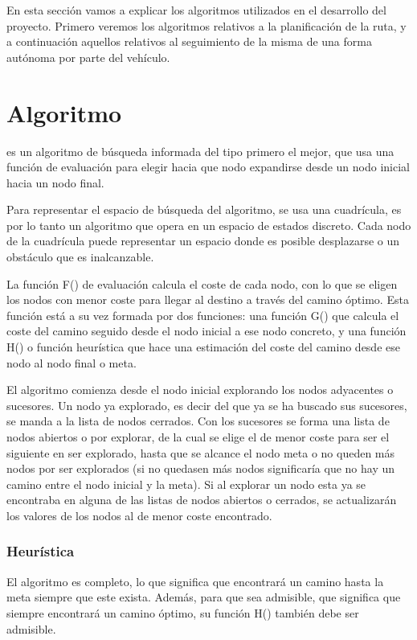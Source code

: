 
En esta sección vamos a explicar los algoritmos utilizados en el desarrollo del proyecto. Primero veremos los algoritmos relativos a la planificación de la ruta, y a continuación aquellos relativos al seguimiento de la misma de una forma autónoma por parte del vehículo.

\section{Algoritmo \Astar}

\Astar es un algoritmo de búsqueda informada del tipo primero el mejor, que usa una función de evaluación para elegir hacia que nodo expandirse desde un nodo inicial hacia un nodo final.

Para representar el espacio de búsqueda del algoritmo, se usa una cuadrícula, es por lo tanto un algoritmo que opera en un espacio de estados discreto. Cada nodo de la cuadrícula puede representar un espacio donde es posible desplazarse o un obstáculo que es inalcanzable.

La función F() de evaluación calcula el coste de cada nodo, con lo que se eligen los nodos con menor coste para llegar al destino a través del camino óptimo. Esta función está a su vez formada por dos funciones: una función G() que calcula el coste del camino seguido desde el nodo inicial a ese nodo concreto, y una función H() o función heurística que hace una estimación del coste del camino desde ese nodo al nodo final o meta.

El algoritmo comienza desde el nodo inicial explorando los nodos adyacentes o sucesores. Un nodo ya explorado, es decir del que ya se ha buscado sus sucesores, se manda a la lista de nodos cerrados. Con los sucesores se forma una lista de nodos abiertos o por explorar, de la cual se elige el de menor coste para ser el siguiente en ser explorado, hasta que se alcance el nodo meta o no queden más nodos por ser explorados (si no quedasen más nodos significaría que no hay un camino entre el nodo inicial y la meta). Si al explorar un nodo esta ya se encontraba en alguna de las listas de nodos abiertos o cerrados, se actualizarán los valores de los nodos al de menor coste encontrado.

\subsubsection{Heurística} \label{heuristicaaestrella}
El algoritmo \Astar es completo, lo que significa que encontrará un camino hasta la meta siempre que este exista. Además, para que sea admisible, que significa que siempre encontrará un camino óptimo, su función H() también debe ser admisible.

